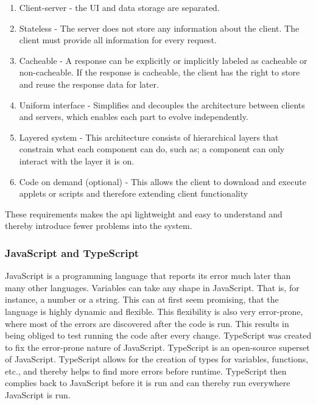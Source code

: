 \begin{enumerate}
  \item Client-server - the UI and data storage are separated. 
  \item Stateless - The server does not store any information about the client. The client must provide all information for every request. 
  \item Cacheable - A response can be explicitly or implicitly labeled as cacheable or non-cacheable. If the response is cacheable, the client has the right to store and reuse the response data for later. 
  \item Uniform interface - Simplifies and decouples the architecture between clients and servers, which enables each part to evolve independently.  
  \item Layered system - This architecture consists of hierarchical layers that constrain what each component can do, such as; a component can only interact with the layer it is on. 
  \item Code on demand (optional) - This allows the client to download and execute applets or scripts and therefore extending client functionality 
\end{enumerate}

These requirements makes the \acrshort{api} lightweight and easy to understand and thereby introduce fewer problems into the system. 


\subsubsection{JavaScript and TypeScript}%
\label{ssub:JavaScript and TypeScript}
JavaScript is a programming language that reports its error much later than many other languages. Variables can take any shape in JavaScript. That is, for instance, a number or a string. This can at first seem promising, that the language is highly dynamic and flexible. This flexibility is also very error-prone, where most of the errors are discovered after the code is run. This results in being obliged to test running the code after every change\cite{taivalsaari2008web}. TypeScript was created to fix the error-prone nature of JavaScript. TypeScript is an open-source superset of JavaScript. TypeScript allows for the creation of types for variables, functions, etc., and thereby helps to find more errors before runtime\cite{WhyYouShould}. TypeScript then complies back to JavaScript before it is run and can thereby run everywhere JavaScript is run\cite{WhyYouShould}.  


